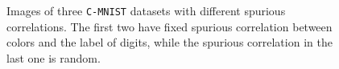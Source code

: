 \begin{figure}[t!]\centering
	\hspace{0.1in}
	\hspace{0.1in}
	\caption{Images of three \texttt{C-MNIST} datasets with different spurious correlations. The first two have fixed spurious correlation between colors and the label of digits, while the spurious correlation in the last one is random.}
	\label{fig:generated data}
\end{figure}
